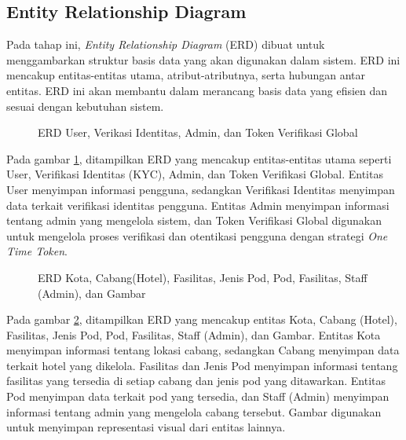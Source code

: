\subsection{Entity Relationship Diagram}

Pada tahap ini, \textit{Entity Relationship Diagram} (ERD) dibuat untuk menggambarkan struktur basis data yang akan digunakan dalam sistem. ERD ini mencakup entitas-entitas utama, atribut-atributnya, serta hubungan antar entitas. ERD ini akan membantu dalam merancang basis data yang efisien dan sesuai dengan kebutuhan sistem.

\begin{figure}[H] %
    \centering
    \caption{ERD User, Verikasi Identitas, Admin, dan Token Verifikasi Global}
    \label{fig:erd_1} %
\end{figure}

Pada gambar \ref{fig:erd_1}, ditampilkan ERD yang mencakup entitas-entitas utama seperti User, Verifikasi Identitas (KYC), Admin, dan Token Verifikasi Global. Entitas User menyimpan informasi pengguna, sedangkan Verifikasi Identitas menyimpan data terkait verifikasi identitas pengguna. Entitas Admin menyimpan informasi tentang admin yang mengelola sistem, dan Token Verifikasi Global digunakan untuk mengelola proses verifikasi dan otentikasi pengguna dengan strategi \textit{One Time Token}.

\begin{figure}[H] %
    \centering
    \caption{ERD Kota, Cabang(Hotel), Fasilitas, Jenis Pod, Pod, Fasilitas, Staff (Admin), dan Gambar}
    \label{fig:erd_2} %
\end{figure}

Pada gambar \ref{fig:erd_2}, ditampilkan ERD yang mencakup entitas Kota, Cabang (Hotel), Fasilitas, Jenis Pod, Pod, Fasilitas, Staff (Admin), dan Gambar. Entitas Kota menyimpan informasi tentang lokasi cabang, sedangkan Cabang menyimpan data terkait hotel yang dikelola. Fasilitas dan Jenis Pod menyimpan informasi tentang fasilitas yang tersedia di setiap cabang dan jenis pod yang ditawarkan. Entitas Pod menyimpan data terkait pod yang tersedia, dan Staff (Admin) menyimpan informasi tentang admin yang mengelola cabang tersebut. Gambar digunakan untuk menyimpan representasi visual dari entitas lainnya.

